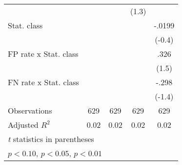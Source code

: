 \begin{table}[htbp]
\begin{tabular}{l*{4}{c}}
                &                  &                  &    (1.3)         &                  \\
Stat. class     &                  &                  &                  &   -.0199         \\
                &                  &                  &                  &   (-0.4)         \\
FP rate x Stat. class&                  &                  &                  &     .326         \\
                &                  &                  &                  &    (1.5)         \\
FN rate x Stat. class&                  &                  &                  &    -.298         \\
                &                  &                  &                  &   (-1.4)         \\
\hline
Observations    &      629         &      629         &      629         &      629         \\
Adjusted \(R^{2}\)&     0.02         &     0.02         &     0.02         &     0.02         \\
\hline\hline
\multicolumn{5}{l}{\footnotesize \textit{t} statistics in parentheses}\\
\multicolumn{5}{l}{\footnotesize \sym{*} \(p<0.10\), \sym{**} \(p<0.05\), \sym{***} \(p<0.01\)}\\
\end{tabular}
\end{table}

